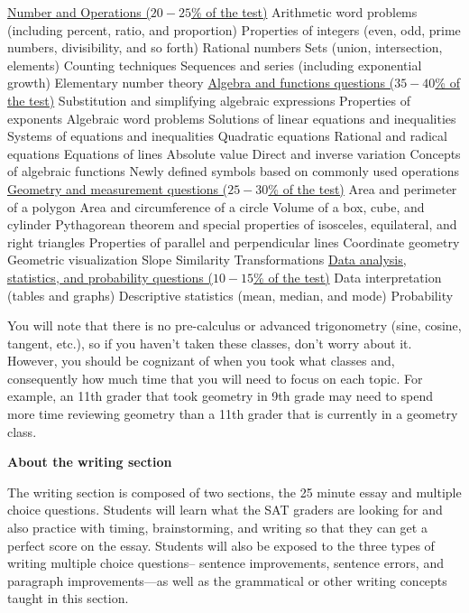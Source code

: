 \documentclass[12pt]{book}
\begin{document}
\bigskip
\begin{outline}
\0 \underline{Number and Operations ($20-25$\% of the test)}
\1 Arithmetic word problems (including percent, ratio, and proportion)
\1 Properties of integers (even, odd, prime numbers, divisibility, and so forth)
\1 Rational numbers
\1 Sets (union, intersection, elements)
\1 Counting techniques
\1 Sequences and series (including exponential growth)
\1 Elementary number theory
\0 \underline{Algebra and functions questions ($35-40$\% of the test)}
\1 Substitution and simplifying algebraic expressions
\1 Properties of exponents
\1 Algebraic word problems
\1 Solutions of linear equations and inequalities
\1 Systems of equations and inequalities
\1 Quadratic equations
\1 Rational and radical equations
\1 Equations of lines
\1 Absolute value
\1 Direct and inverse variation
\1 Concepts of algebraic functions
\1 Newly defined symbols based on commonly used operations
\0 \underline{Geometry and measurement questions ($25-30$\% of the test)}
\1 Area and perimeter of a polygon
\1 Area and circumference of a circle
\1 Volume of a box, cube, and cylinder
\1 Pythagorean theorem and special properties of isosceles, equilateral, and right triangles
\1 Properties of parallel and perpendicular lines
\1 Coordinate geometry
\1 Geometric visualization
\1 Slope
\1 Similarity
\1 Transformations
\0 \underline{Data analysis, statistics, and probability questions ($10-15$\% of the test)}
\1 Data interpretation (tables and graphs)
\1 Descriptive statistics (mean, median, and mode)
\1 Probability
\end{outline}

You will note that there is no pre-calculus or advanced trigonometry (sine, cosine, tangent, etc.), so if you haven't taken these classes, don't worry about it. However, you should be cognizant of when you took what classes and, consequently how much time that you will need to focus on each topic. For example, an 11th grader that took geometry in 9th grade may need to spend more time reviewing geometry than a 11th grader that is currently in a geometry class.

\bigskip
\textbf{\large About the writing section}

The writing section is composed of two sections, the 25 minute essay and multiple choice questions. Students will learn what the SAT graders are looking for and also practice with timing, brainstorming, and writing so that they can get a perfect score on the essay. Students will also be exposed to the three types of writing multiple choice questions-- sentence improvements, sentence errors, and paragraph improvements—as well as the grammatical or other writing concepts taught in this section.
\end{document}
